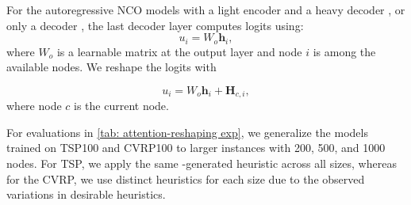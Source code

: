 For the autoregressive NCO models with a light encoder and a heavy decoder \cite{luo2023nco_heavy_decoder}, or only a decoder \cite{drakulic2023bqnco}, the last decoder layer computes logits using:
\begin{equation}
    u_i = W_o \mathbf{h}_i,
\end{equation}
where \( W_o \) is a learnable matrix at the output layer and node \( i \) is among the available nodes. We reshape the logits with

\begin{equation}
    u_i = W_o \mathbf{h}_i + \mathbf{H}_{c, i},
\end{equation}
where node \( c \) is the current node.



For evaluations in \cref{tab: attention-reshaping exp}, we generalize the models trained on TSP100 and CVRP100 to larger instances with 200, 500, and 1000 nodes. For TSP, we apply the same \our{}-generated heuristic across all sizes, whereas for the CVRP, we use distinct heuristics for each size due to the observed variations in desirable heuristics.
